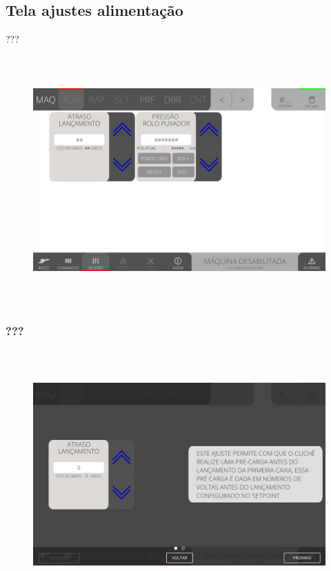 \thispagestyle{fancy}
\vspace*{\fill}
\subsection{Tela ajustes alimentação}
 ???
\begin{figure}[h]
  \centering
  \includegraphics[width=576px,height=360px]{src/imagesFlexo/03-feeder/settings/e-Tela-Principal.png}
   \label{}
\end{figure}

\newpage
\thispagestyle{fancy}
\vspace*{\fill}
\subsubsection{\small{???}}
\begin{figure}[h]
  \centering
  \includegraphics[width=576px,height=360px]{src/imagesFlexo/03-feeder/settings/e-1.png}
   \label{}
\end{figure}
\vspace*{\fill}

